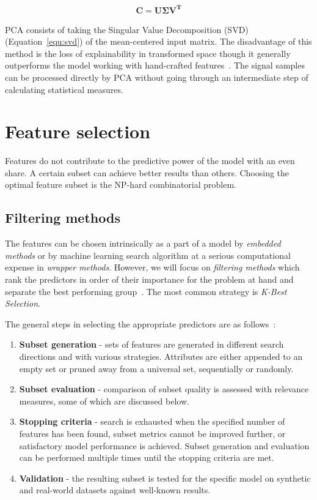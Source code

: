 \begin{ceqn}\begin{align}
\mathbf{C} = \mathbf{U \Sigma V^T}
\label{equ:svd}
\end{align}\end{ceqn}

PCA consists of taking the Singular Value Decomposition (SVD) (Equation~\ref{equ:svd}) of the mean-centered input matrix. The disadvantage of this method is the loss of explainability in transformed space though it generally outperforms the model working with hand-crafted features~\cite{brito_fault_2021}. The signal samples can be processed directly by PCA without going through an intermediate step of calculating statistical measures. 

\section{Feature selection}
Features do not contribute to the predictive power of the model with an even share. A certain subset can achieve better results than others. Choosing the optimal feature subset is the NP-hard combinatorial problem.

\subsection{Filtering methods}
The features can be chosen intrinsically as a part of a model by \emph{embedded methods} or by machine learning search algorithm at a serious computational expense in \emph{wrapper methods}. However, we will focus on \emph{filtering methods} which rank the predictors in order of their importance for the problem at hand and separate the best performing group~\cite{johnson_feature_2019}. The most common strategy is \emph{K-Best Selection}.

The general steps in selecting the appropriate predictors are as follows~\cite{nandi_condition_2019}:

\begin{enumerate}
    \itemsep0pt
    \item \textbf{Subset generation} - sets of features are generated in different search directions and with various strategies. Attributes are either appended to an empty set or pruned away from a universal set, sequentially or randomly.
    
    \item \textbf{Subset evaluation} - comparison of subset quality is assessed with relevance measures, some of which are discussed below.

    \item \textbf{Stopping criteria} - search is exhausted when the specified number of features has been found, subset metrics cannot be improved further, or satisfactory model performance is achieved. Subset generation and evaluation can be performed multiple times until the stopping criteria are met.

    \item \textbf{Validation} - the resulting subset is tested for the specific model on synthetic and real-world datasets against well-known results. 
\end{enumerate}

